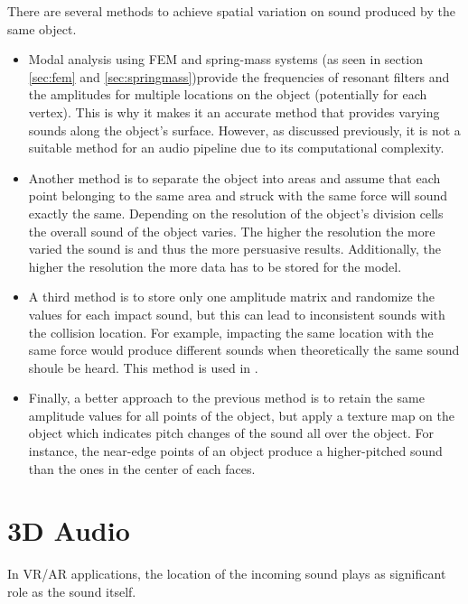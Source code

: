 There are several methods to achieve spatial variation on sound produced by the same object. 
\begin{itemize}
\item Modal analysis using \gls{FEM} and spring-mass systems (as seen in section \ref{sec:fem} and \ref{sec:springmass})provide the frequencies of resonant filters and the amplitudes for multiple locations on the object (potentially for each vertex). This is why it makes it an accurate method that provides varying sounds along the object's surface. However, as discussed previously, it is not a suitable method for an audio pipeline due to its computational complexity.

\item Another method is to separate the object into areas and assume that each point belonging to the same area and struck with the same force will sound exactly the same. Depending on the resolution of the object's division cells the overall sound of the object varies. The higher the resolution the more varied the sound is and thus the more persuasive results. Additionally, the higher the resolution the more data has to be stored for the model.

\item A third method is to store only one amplitude matrix and randomize the values for each impact sound, but this can lead to  inconsistent sounds with the collision location. For example, impacting the same location with the same force would produce different sounds when theoretically the same sound shoule be heard. This method is used in \cite{lloyd2011sound}.

\item Finally, a better approach to the previous method is to retain the same amplitude values for all points of the object, but apply a texture map on the object which indicates pitch changes of the sound all over the object. For instance, the near-edge points of an object produce a higher-pitched sound than the ones in the center of each faces. 

\end{itemize}

\section{3D Audio}
In VR/AR applications, the location of the incoming sound plays as significant role as the sound itself. 

